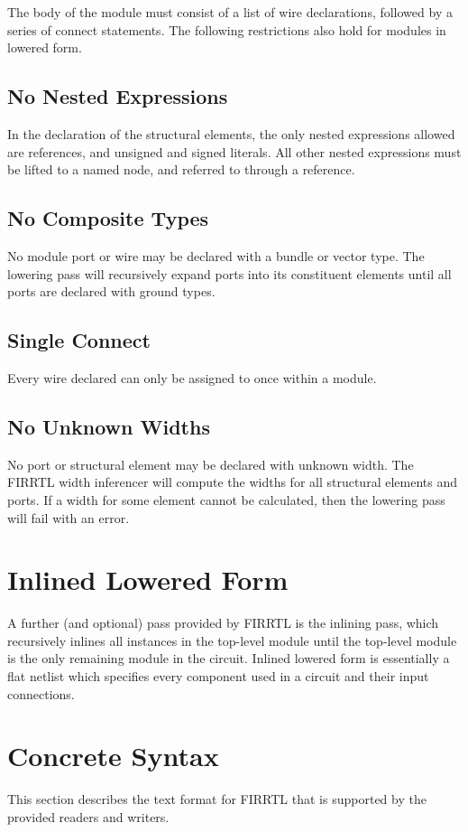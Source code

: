 \documentclass[12pt]{article}
\begin{document}
The body of the module must consist of a list of wire declarations, followed by a series of connect statements.
The following restrictions also hold for modules in lowered form.

\subsection{No Nested Expressions}
In the declaration of the structural elements, the only nested expressions allowed are references, and unsigned and signed literals.
All other nested expressions must be lifted to a named node, and referred to through a reference. 

\subsection{No Composite Types}
No module port or wire may be declared with a bundle or vector type.
The lowering pass will recursively expand ports into its constituent elements until all ports are declared with ground types.

\subsection{Single Connect}
Every wire declared can only be assigned to once within a module.

\subsection{No Unknown Widths}
No port or structural element may be declared with unknown width.
The FIRRTL width inferencer will compute the widths for all structural elements and ports.
If a width for some element cannot be calculated, then the lowering pass will fail with an error.

\section{Inlined Lowered Form}
A further (and optional) pass provided by FIRRTL is the inlining pass, which recursively inlines all instances in the top-level module until the top-level module is the only remaining module in the circuit.
Inlined lowered form is essentially a flat netlist which specifies every component used in a circuit and their input connections. 

\section{Concrete Syntax}\label{concrete}
This section describes the text format for FIRRTL that is supported by the provided readers and writers.
\end{document}

